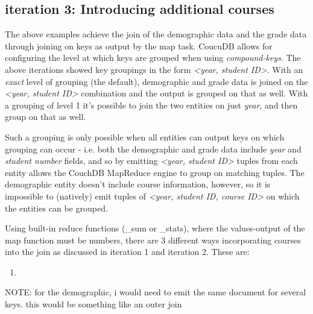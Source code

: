 \subsection{iteration 3: Introducing additional courses}
The above examples achieve the join of the demographic data and the grade data through joining on keys as output by the map task. CoucuDB allows for configuring the level at which keys are grouped when using \textit{compound-keys}. The above iterations showed key groupings in the form \textit{<year, student ID>}. With an \textit{exact} level of grouping (the default), demographic and grade data is joined on the \textit{<year, student ID>} combination and the output is grouped on that as well. With a grouping of level 1 it's possible to join the two entities on just \textit{year}, and then group on that as well.

Such a grouping is only possible when all entities can output keys on which grouping can occur - i.e. both the demographic and grade data include \textit{year} and \textit{student number} fields, and so by emitting \textit{<year, student ID>} tuples from each entity allows the CouchDB MapReduce engine to group on matching tuples. The demographic entity doesn't include course information, however, so it is impossible to (natively) emit tuples of \textit{<year, student ID, course ID>} on which the entities can be grouped.

Using built-in reduce functions (\_sum or \_stats), where the values-output of the map function must be numbers, there are 3 different ways incorporating courses into the join as discussed in iteration 1 and iteration 2. These are:

\begin{enumerate}
    \item
\end{enumerate}


NOTE:
for the demographic, i would need to emit the same document for several keys. this would be something like an outer join